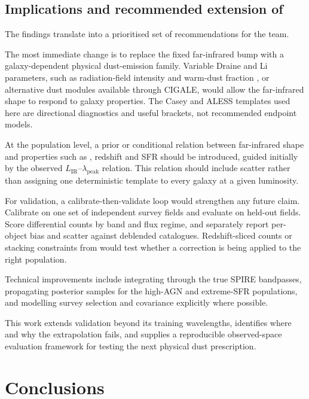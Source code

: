 \documentclass[12pt,a4paper]{article}
\begin{document}
\subsection{Implications and recommended extension of \popcosmos{}}
\label{sec:discussion:recommendations}

The findings translate into a prioritised set of recommendations for the \popcosmos{}
team.

The most immediate change is to replace the fixed far-infrared bump with a
galaxy-dependent physical dust-emission family. Variable Draine and Li parameters, such
as radiation-field intensity and warm-dust fraction \citep{Draine_2007}, or alternative
dust modules available through CIGALE, would allow the far-infrared shape to respond to
galaxy properties. The Casey and ALESS templates used here are directional diagnostics
and useful brackets, not recommended endpoint models.

At the population level, a prior or conditional relation between far-infrared shape and
properties such as \LIR{}, redshift and SFR should be introduced, guided initially by
the observed $L_\mathrm{IR}$--$\lambda_\mathrm{peak}$ relation. This relation should
include scatter rather than assigning one deterministic template to every galaxy at a
given luminosity.

For validation, a calibrate-then-validate loop would strengthen any future claim.
Calibrate on one set of independent survey fields and evaluate on held-out fields.
Score differential counts by band and flux regime, and separately report per-object bias
and scatter against deblended catalogues. Redshift-sliced counts or stacking
constraints from \citet{B_thermin_2012} would test whether a correction is being applied
to the right population.

Technical improvements include integrating through the true SPIRE bandpasses,
propagating posterior samples for the high-AGN and extreme-SFR populations, and
modelling survey selection and covariance explicitly where possible.

This work extends \popcosmos{} validation beyond its training wavelengths, identifies
where and why the extrapolation fails, and supplies a reproducible observed-space
evaluation framework for testing the next physical dust prescription.

\section{Conclusions}
\label{sec:conclusions}
\end{document}
